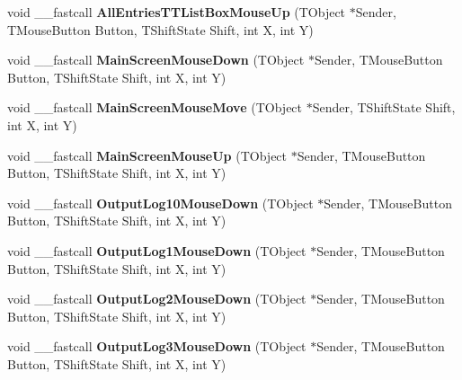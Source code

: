 \begin{DoxyCompactItemize}
\mbox{\label{class_t_interface_a189a4b05f27d6b5ec8b9a90ec1a9cc50}} 
void \+\_\+\+\_\+fastcall {\bfseries All\+Entries\+T\+T\+List\+Box\+Mouse\+Up} (T\+Object $\ast$Sender, T\+Mouse\+Button Button, T\+Shift\+State Shift, int X, int Y)
\item 
\mbox{\label{class_t_interface_a7f37862fb9e01e1328d9fd3fd8c50094}} 
void \+\_\+\+\_\+fastcall {\bfseries Main\+Screen\+Mouse\+Down} (T\+Object $\ast$Sender, T\+Mouse\+Button Button, T\+Shift\+State Shift, int X, int Y)
\item 
\mbox{\label{class_t_interface_abb268a3a209bc0d66111540c84345c1b}} 
void \+\_\+\+\_\+fastcall {\bfseries Main\+Screen\+Mouse\+Move} (T\+Object $\ast$Sender, T\+Shift\+State Shift, int X, int Y)
\item 
\mbox{\label{class_t_interface_a03280ee86df28a9a7cf4473cdf7b9f8b}} 
void \+\_\+\+\_\+fastcall {\bfseries Main\+Screen\+Mouse\+Up} (T\+Object $\ast$Sender, T\+Mouse\+Button Button, T\+Shift\+State Shift, int X, int Y)
\item 
\mbox{\label{class_t_interface_a32a17f1f0612836659a33a2e078afaad}} 
void \+\_\+\+\_\+fastcall {\bfseries Output\+Log10\+Mouse\+Down} (T\+Object $\ast$Sender, T\+Mouse\+Button Button, T\+Shift\+State Shift, int X, int Y)
\item 
\mbox{\label{class_t_interface_a5570aabf46e5a22819020d6568076fc2}} 
void \+\_\+\+\_\+fastcall {\bfseries Output\+Log1\+Mouse\+Down} (T\+Object $\ast$Sender, T\+Mouse\+Button Button, T\+Shift\+State Shift, int X, int Y)
\item 
\mbox{\label{class_t_interface_a2851df85ed71a1b1dbd8baa4dc1a2073}} 
void \+\_\+\+\_\+fastcall {\bfseries Output\+Log2\+Mouse\+Down} (T\+Object $\ast$Sender, T\+Mouse\+Button Button, T\+Shift\+State Shift, int X, int Y)
\item 
\mbox{\label{class_t_interface_ae66cf19e40646ae18b79c3cf9c1842a0}} 
void \+\_\+\+\_\+fastcall {\bfseries Output\+Log3\+Mouse\+Down} (T\+Object $\ast$Sender, T\+Mouse\+Button Button, T\+Shift\+State Shift, int X, int Y)
\item 

\end{DoxyCompactItemize}
